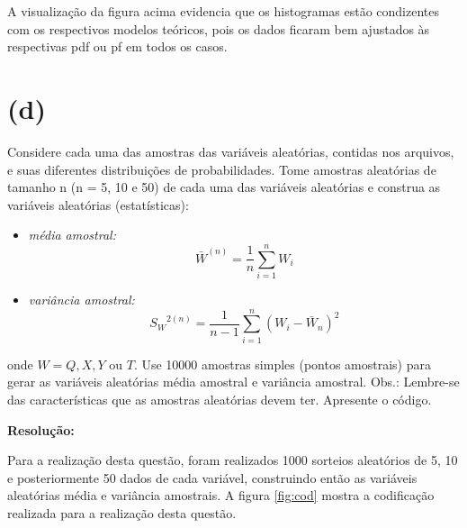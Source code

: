 \documentclass[]{abntex2}
\begin{document}
A visualização da figura acima evidencia que os histogramas estão condizentes com os respectivos modelos teóricos, pois os dados ficaram bem ajustados às respectivas pdf ou pf em todos os casos.

\section*{\textbf{(d)}}

\noindent Considere cada uma das amostras das variáveis aleatórias, contidas nos arquivos, e suas diferentes distribuições de probabilidades. Tome amostras aleatórias de tamanho n (n = 5, 10 e 50) de cada uma das variáveis aleatórias e construa as variáveis aleatórias (estatísticas):

\begin{itemize}
    \item \textit{média amostral:} \[{\bar{W}}^{(n)}=\dfrac{1}{n} \sum_{i=1}^{n} W_i\]
    \item \textit{variância amostral:} \[{S_W}^{2(n)}=\dfrac{1}{n-1} \sum_{i=1}^{n}(W_i - \bar{W}_n)^2\]
\end{itemize}

onde $W = Q, X, Y$ ou $T$. Use 10000 amostras simples (pontos amostrais) para gerar
as variáveis aleatórias média amostral e variância amostral. Obs.: Lembre-se das
características que as amostras aleatórias devem ter. Apresente o código.

\textbf{Resolução:}

Para a realização desta questão, foram realizados 1000 sorteios aleatórios de 5, 10 e posteriormente 50 dados de cada variável, construindo então as variáveis aleatórias média e variância amostrais. A figura \ref{fig:cod} mostra a codificação realizada para a realização desta questão.
\end{document}
